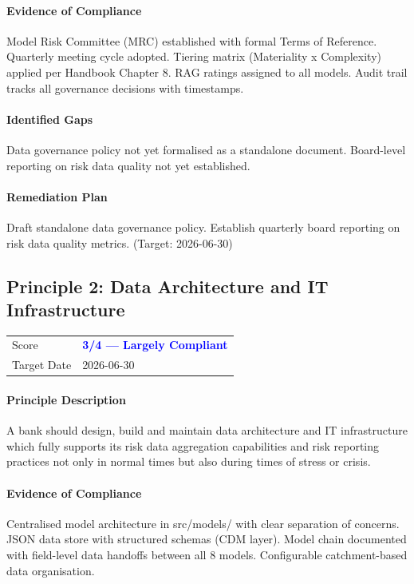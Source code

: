 \documentclass[11pt]{article}
\begin{document}
\paragraph{Evidence of Compliance}
Model Risk Committee (MRC) established with formal Terms of Reference. Quarterly meeting cycle adopted. Tiering matrix (Materiality x Complexity) applied per Handbook Chapter 8. RAG ratings assigned to all models. Audit trail tracks all governance decisions with timestamps.

\paragraph{Identified Gaps}
Data governance policy not yet formalised as a standalone document. Board-level reporting on risk data quality not yet established.

\paragraph{Remediation Plan}
Draft standalone data governance policy. Establish quarterly board reporting on risk data quality metrics. (Target: 2026-06-30)

\subsection{Principle 2: Data Architecture and IT Infrastructure}

\begin{table}[H]
    \centering
    \begin{tabular}{ll}
        \toprule
        Score & \textcolor{blue}{\textbf{3/4 --- Largely Compliant}} \\
        Target Date & 2026-06-30 \\
        \bottomrule
    \end{tabular}
\end{table}

\paragraph{Principle Description}
A bank should design, build and maintain data architecture and IT infrastructure which fully supports its risk data aggregation capabilities and risk reporting practices not only in normal times but also during times of stress or crisis.

\paragraph{Evidence of Compliance}
Centralised model architecture in src/models/ with clear separation of concerns. JSON data store with structured schemas (CDM layer). Model chain documented with field-level data handoffs between all 8 models. Configurable catchment-based data organisation.
\end{document}
